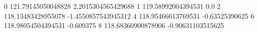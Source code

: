 0 121.79145050048828 2.2015304565429688
1 119.58992004394531 0.0
2 118.13483428955078 -1.4550857543945312
4 118.95466613769531 -0.63525390625
6 118.98054504394531 -0.609375
8 118.68360900878906 -0.90631103515625
